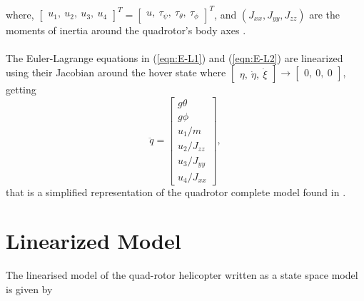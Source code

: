 where, $\begin{bmatrix}
u_{1},\ u_{2},\ u_{3}, \ u_{4}
\end{bmatrix}^{T} = \begin{bmatrix}
u,\ \tau_{\psi},\ \tau_{\theta},\ \tau_{\phi}
\end{bmatrix}^{T} $, and $ (J_{xx}, J_{yy}, J_{zz}) $ are the moments of inertia around the quadrotor's body axes \cite{Emam2016, Badr2016}.
\\\\
The Euler-Lagrange equations in (\ref{eqn:E-L1}) and (\ref{eqn:E-L2}) are linearized using their Jacobian around the hover state where $\begin{bmatrix}
\eta,\ \dot{\eta},\ \dot{\xi}
\end{bmatrix} \to \begin{bmatrix}
0,\ 0,\ 0
\end{bmatrix}$, getting
\begin{equation}
\label{eqn:linear}
\ddot{q}
=
\begin{bmatrix}
g\theta \\
g\phi\\
u_{1}/m \\
u_{2}/J_{zz} \\
u_{3}/J_{yy} \\
u_{4}/J_{xx}
\end{bmatrix},
\end{equation}
that is a simplified representation of the quadrotor complete model found in \cite{Bouabdallah2007}.



\section{Linearized Model}
\setcounter{MaxMatrixCols}{20}

The linearised model of the quad-rotor helicopter written as a state space model is given by

